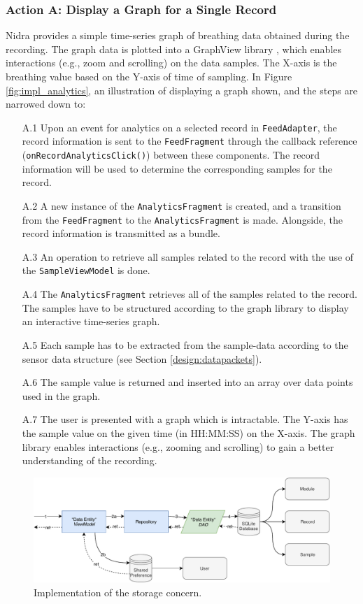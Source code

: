\subsubsection{Action A: Display a Graph for a Single Record}
Nidra provides a simple time-series graph of breathing data obtained during the recording. The graph data is plotted into a GraphView library \cite{androidgraph}, which enables interactions (e.g., zoom and scrolling) on the data samples. The X-axis is the breathing value based on the Y-axis of time of sampling. In Figure \ref{fig:impl_analytics}, an illustration of displaying a graph shown, and the steps are narrowed down to:

\begin{itemize}
    \item[A.1] Upon an event for analytics on a selected record in \verb|FeedAdapter|, the record information is sent to the \verb|FeedFragment| through the callback reference (\verb|onRecordAnalyticsClick()|) between these components. The record information will be used to determine the corresponding samples for the record.
    \item[A.2] A new instance of the \verb|AnalyticsFragment| is created, and a transition from the \verb|FeedFragment| to the \verb|AnalyticsFragment| is made. Alongside, the record information is transmitted as a bundle.
    \item[A.3] An operation to retrieve all samples related to the record with the use of the \verb|SampleViewModel| is done. 
    \item[A.4] The \verb|AnalyticsFragment| retrieves all of the samples related to the record. The samples have to be structured according to the graph library to display an interactive time-series graph.
    \item[A.5] Each sample has to be extracted from the sample-data according to the sensor data structure (see Section \ref{design:datapackets}).
    \item[A.6] The sample value is returned and inserted into an array over data points used in the graph. 
    \item[A.7] The user is presented with a graph which is intractable. The Y-axis has the sample value on the given time (in HH:MM:SS) on the X-axis. The graph library enables interactions (e.g., zooming and scrolling) to gain a better understanding of the recording. 
\end{itemize}

\begin{figure}[!h]
    \centering
    \includegraphics[scale=0.60]{images/Storage_Imp.pdf}
    \caption{Implementation of the storage concern.}
    \label{fig:impl_storage}
\end{figure}

